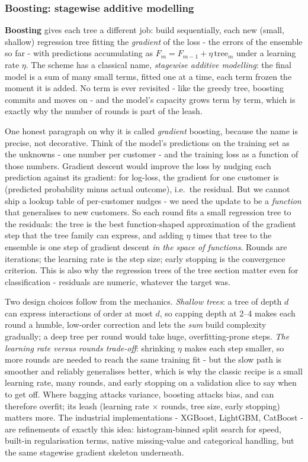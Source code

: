 \documentclass[11pt,a4paper]{article}
\begin{document}
\subsubsection{Boosting: stagewise additive modelling}
\textbf{Boosting} gives each tree a different job: build sequentially, each
new (small, shallow) regression tree fitting the \emph{gradient} of the
loss - the errors of the ensemble so far - with predictions
accumulating as $F_m = F_{m-1} + \eta\,\text{tree}_m$ under a learning
rate $\eta$. The scheme has a classical name, \emph{stagewise additive
modelling}: the final model is a sum of many small terms, fitted one
at a time, each term frozen the moment it is added. No term is ever
revisited - like the greedy tree, boosting commits and moves on - and
the model's capacity grows term by term, which is exactly why the
number of rounds is part of the leash.

One honest paragraph on why it is called \emph{gradient} boosting,
because the name is precise, not decorative. Think of the model's
predictions on the training set as the unknowns - one number per
customer - and the training loss as a function of those numbers.
Gradient descent would improve the loss by nudging each prediction
against its gradient: for log-loss, the gradient for one customer is
(predicted probability minus actual outcome), i.e.\ the residual. But
we cannot ship a lookup table of per-customer nudges - we need the
update to be a \emph{function} that generalises to new customers. So
each round fits a small regression tree to the residuals: the tree is
the best function-shaped approximation of the gradient step that the
tree family can express, and adding $\eta$ times that tree to the
ensemble is one step of gradient descent \emph{in the space of
functions}. Rounds are iterations; the learning rate is the step size;
early stopping is the convergence criterion. This is also why the
regression trees of the tree section matter even for classification -
residuals are numeric, whatever the target was.

Two design choices follow from the mechanics. \emph{Shallow trees}: a
tree of depth $d$ can express interactions of order at most $d$, so
capping depth at 2--4 makes each round a humble, low-order correction
and lets the \emph{sum} build complexity gradually; a deep tree per
round would take huge, overfitting-prone steps. \emph{The learning
rate versus rounds trade-off}: shrinking $\eta$ makes each step
smaller, so more rounds are needed to reach the same training fit -
but the slow path is smoother and reliably generalises better, which
is why the classic recipe is a small learning rate, many rounds, and
early stopping on a validation slice to say when to get off. Where
bagging attacks variance, boosting attacks bias, and can
therefore overfit; its leash (learning rate $\times$ rounds, tree size,
early stopping) matters more. The industrial implementations - XGBoost,
LightGBM, CatBoost - are refinements of exactly this idea:
histogram-binned split search for speed, built-in regularisation
terms, native missing-value and categorical handling, but the same
stagewise gradient skeleton underneath.
\end{document}
